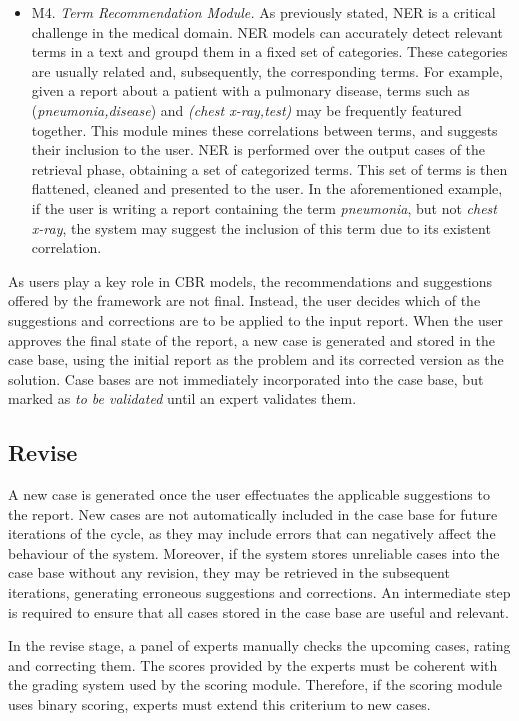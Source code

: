 \begin{itemize}
    \item M4. \textit{Term Recommendation Module.} As previously stated, NER is a critical challenge in the medical domain. NER models can accurately detect relevant terms in a text and groupd them in a fixed set of categories. These categories are usually related and, subsequently, the corresponding terms. For example, given a report about a patient with a pulmonary disease, terms such as (\textit{pneumonia,disease}) and \textit{(chest x-ray,test)} may be frequently featured together. This module mines these correlations between terms, and suggests their inclusion to the user. NER is performed over the output cases of the retrieval phase, obtaining a set of categorized terms. This set of terms is then flattened, cleaned and presented to the user. In the aforementioned example, if the user is writing a report containing the term \textit{pneumonia}, but not \textit{chest x-ray}, the system may suggest the inclusion of this term due to its existent correlation.

\end{itemize}

As users play a key role in CBR models, the recommendations and suggestions offered by the framework are not final. Instead, the user decides which of the suggestions and corrections are to be applied to the input report. When the user approves the final state of the report, a new case is generated and stored in the case base, using the initial report as the problem and its corrected version as the solution. Case bases are not immediately incorporated into the case base, but marked as \textit{to be validated} until an expert validates them.

\subsection{Revise}\label{5_sec:dl_powered_cbr_revise}
A new case is generated once the user effectuates the applicable suggestions to the report. New cases are not automatically included in the case base for future iterations of the cycle, as they may include errors that can negatively affect the behaviour of the system. Moreover, if the system stores unreliable cases into the case base without any revision, they may be retrieved in the subsequent iterations, generating erroneous suggestions and corrections. An intermediate step is required to ensure that all cases stored in the case base are useful and relevant. 

In the revise stage, a panel of experts manually checks the upcoming cases, rating and correcting them. The scores provided by the experts must be coherent with the grading system used by the scoring module. Therefore, if the scoring module uses binary scoring, experts must extend this criterium to new cases.


